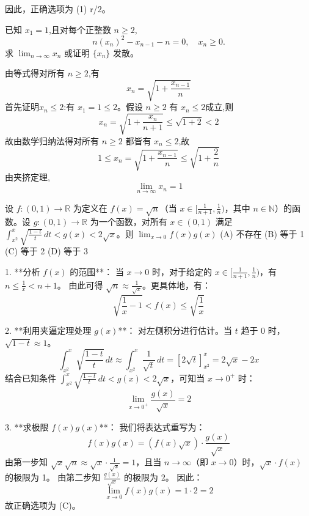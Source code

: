 \begin{questions}
\begin{solution}
因此，正确选项为 (1) r/2。
\end{solution}
    \question 已知 $x_{1}=1$,且对每个正整数 $n\ge 2$,
    \[
    n(x_{n})^{2}-x_{n-1}-n=0,\quad x_{n}\ge 0.
    \]
    求 $\displaystyle\lim_{n\to\infty} x_{n}$ 或证明 $\{x_{n}\}$ 发散。
    \begin{solution}
        由等式得对所有 $n\ge 2$,有
        \[
        x_n=\sqrt{1+\frac{x_{n-1}}{n}}
        \]
        首先证明$x_n \le 2$:有 $x_1=1\le 2$。假设 $n\ge 2$ 有 $x_n\le 2$成立,则
        \[
        x_n=\sqrt{1+\frac{x_{n}}{n+1}}\le \sqrt{1+2} <2
        \]
        故由数学归纳法得对所有 $n\ge 2$ 都皆有 $x_n\le 2$,故
        \[
        1 \le x_n=\sqrt{1+\frac{x_{n-1}}{n}}\le \sqrt{1+\frac{2}{n}}
        \]
        由夹挤定理,
        \[
        \lim_{n\to\infty} x_{n} = 1
        \]
    \end{solution}

    \question 设 $f : (0, 1) \to \mathbb{R}$ 为定义在 $f(x) = \sqrt{n}$（当 $x \in [\frac{1}{n+1}, \frac{1}{n})$，其中 $n \in \mathbb{N}$）的函数。设 $g : (0, 1) \to \mathbb{R}$ 为一个函数，对所有 $x \in (0, 1)$ 满足 $\int_{x^2}^x \sqrt{\frac{1-t}{t}} \,dt < g(x) < 2\sqrt{x}$。则 $\lim_{x \to 0} f(x)g(x)$
(A) 不存在 \qquad (B) 等于 1 \qquad (C) 等于 2 \qquad (D) 等于 3

\begin{solution}
1. **分析 $f(x)$ 的范围**：
当 $x \to 0$ 时，对于给定的 $x \in [\frac{1}{n+1}, \frac{1}{n})$，有 $n \le \frac{1}{x} < n+1$。
由此可得 $\sqrt{n} \approx \frac{1}{\sqrt{x}}$。更具体地，有：
\[
\sqrt{\frac{1}{x}-1} < f(x) \le \sqrt{\frac{1}{x}}
\]

2. **利用夹逼定理处理 $g(x)$**：
对左侧积分进行估计。当 $t$ 趋于 0 时，$\sqrt{1-t} \approx 1$。
\[
\int_{x^2}^x \sqrt{\frac{1-t}{t}} \,dt \approx \int_{x^2}^x \frac{1}{\sqrt{t}} \,dt = \left[ 2\sqrt{t} \right]_{x^2}^x = 2\sqrt{x} - 2x
\]
结合已知条件 $\int_{x^2}^x \sqrt{\frac{1-t}{t}} \,dt < g(x) < 2\sqrt{x}$，可知当 $x \to 0^+$ 时：
\[
\lim_{x \to 0^+} \frac{g(x)}{\sqrt{x}} = 2
\]

3. **求极限 $f(x)g(x)$**：
我们将表达式重写为：
\[
f(x)g(x) = (f(x)\sqrt{x}) \cdot \frac{g(x)}{\sqrt{x}}
\]
由第一步知 $\sqrt{x} \sqrt{n} \approx \sqrt{x} \cdot \frac{1}{\sqrt{x}} = 1$，且当 $n \to \infty$（即 $x \to 0$）时，$\sqrt{x} \cdot f(x)$ 的极限为 1。
由第二步知 $\frac{g(x)}{\sqrt{x}}$ 的极限为 2。
因此：
\[
\lim_{x \to 0} f(x)g(x) = 1 \cdot 2 = 2
\]
故正确选项为 (C)。
\end{solution}

    \question 
    \begin{parts}

\end{parts}
\end{questions}
